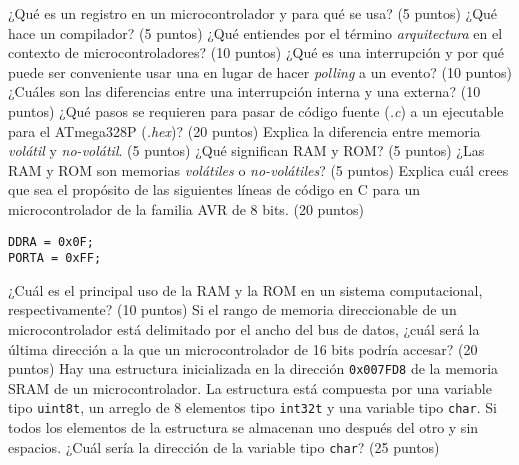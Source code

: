 \documentclass[11pt,letterpaper]{exam}
\begin{document}
\begin{questions}
\question ¿Qué es un registro en un microcontrolador y para qué se usa? (5 puntos)
\vspace{1cm}
\question ¿Qué hace un compilador? (5 puntos)
\vspace{1cm}
\question ¿Qué entiendes por el término \textit{arquitectura} en el contexto de microcontroladores? (10 puntos)
\question ¿Qué es una interrupción y por qué puede ser conveniente usar una en lugar de hacer \textit{polling} a un evento? (10 puntos) 
\question ¿Cuáles son las diferencias entre una interrupción interna y una externa? (10 puntos)
\question ¿Qué pasos se requieren para pasar de código fuente (\textit{.c}) a un ejecutable para el ATmega328P (\textit{.hex})? (20 puntos)
\clearpage
\question Explica la diferencia entre memoria \textit{volátil} y \textit{no-volátil}. (5 puntos)
\vspace{1cm}
\question ¿Qué significan RAM y ROM? (5 puntos)
\vspace{1cm}
\question ¿Las RAM y ROM son memorias \textit{volátiles} o \textit{no-volátiles}? (5 puntos)
\vspace{1cm}
\question Explica cuál crees que sea el propósito de las siguientes líneas de código en C para un microcontrolador de la familia AVR de 8 bits. (20 puntos) 
\begin{lstlisting}[style=CStyle]
DDRA = 0x0F;
PORTA = 0xFF;
\end{lstlisting}
\question ¿Cuál es el principal uso de la RAM y la ROM en un sistema computacional, respectivamente? (10 puntos)
\question Si el rango de memoria direccionable de un microcontrolador está delimitado por el ancho del bus de datos, ¿cuál será la última dirección a la que un microcontrolador de 16 bits podría accesar? (20 puntos)
\question Hay una estructura inicializada en la dirección \texttt{0x007FD8} de la memoria SRAM de un microcontrolador. La estructura está compuesta por una variable tipo \texttt{uint8\textunderscore t}, un arreglo de 8 elementos tipo \texttt{int32\textunderscore t} y una variable tipo \texttt{char}. Si todos los elementos de la estructura se almacenan uno después del otro y sin espacios. ¿Cuál sería la dirección de la variable tipo \texttt{char}? (25 puntos)
\end{questions}
\thispagestyle{empty}
\end{document}
